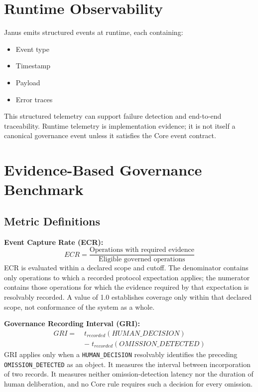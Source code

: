\documentclass[conference]{IEEEtran}
\begin{document}
\section{Runtime Observability}

Janus emits structured events at runtime, each containing:
\begin{itemize}
    \item Event type
    \item Timestamp
    \item Payload
    \item Error traces
\end{itemize}

This structured telemetry can support failure detection and end-to-end
traceability. Runtime telemetry is implementation evidence; it is not itself a
canonical governance event unless it satisfies the Core event contract.

\section{Evidence-Based Governance Benchmark}

\subsection{Metric Definitions}

\noindent\textbf{Event Capture Rate (ECR):}
\begin{equation}
  ECR = \frac{\text{Operations with required evidence}}{\text{Eligible governed operations}}
\end{equation}
ECR is evaluated within a declared scope and cutoff. The denominator contains
only operations to which a recorded protocol expectation applies; the numerator
contains those operations for which the evidence required by that expectation
is resolvably recorded. A value of 1.0 establishes coverage only within that
declared scope, not conformance of the system as a whole.

\medskip
\noindent\textbf{Governance Recording Interval (GRI):}
\begin{equation}
\begin{split}
  GRI = \; & t_{recorded}(\mathit{HUMAN\_DECISION}) \\
            & - \; t_{recorded}(\mathit{OMISSION\_DETECTED})
\end{split}
\end{equation}
GRI applies only when a \texttt{HUMAN\_DECISION} resolvably identifies the
preceding \texttt{OMISSION\_DETECTED} as an object. It measures the interval
between incorporation of two records. It measures neither omission-detection
latency nor the duration of human deliberation, and no Core rule requires such a
decision for every omission.
\end{document}
